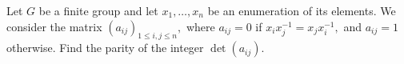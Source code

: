 Let $G$ be a finite group and let $x_1,…,x_n$ be an enumeration of its elements. We consider the matrix $(a_{ij})_{1 \le i,j \le n},$ where $a_{ij}=0$ if $x_ix_j^{-1}=x_jx_i^{-1},$ and $a_{ij}=1$ otherwise. Find the parity of the integer $\det(a_{ij}).$